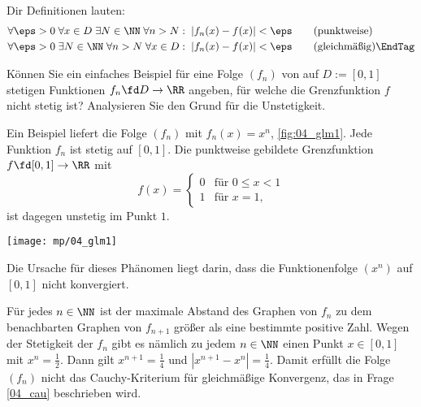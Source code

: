 \begin{antwort}
 Dir Definitionen lauten:
\begin{align}
\forall \eps > 0\; \forall x\in D\;  
\exists N\in\NN\; \forall n > N:\;| f_n(x)-f(x) | < \eps &\qquad 
\text{(punktweise)} \notag \\
\forall \eps > 0\;  \exists N\in\NN\;
\forall n > N\; \forall x\in D:\; | f_n(x)-f(x) | < \eps &\qquad 
\text{(gleichmäßig)} \EndTag 
\end{align}
\end{antwort} 

\begin{frage}\label{04_gbsp}
Können Sie ein einfaches Beispiel für eine Folge $(f_n)$ von 
auf $D:= [0,1]$ stetigen Funktionen $f_n\fd D \to \RR$ angeben, für welche 
die Grenzfunktion $f$ nicht stetig ist? Analysieren Sie den Grund für die 
Unstetigkeit.
\end{frage}
 

\begin{antwort}
Ein Beispiel liefert die Folge $(f_n)$ mit 
$f_n(x) =x^n$, \sieheAbbildung\ref{fig:04_glm1}. 
Jede Funktion $f_n$ ist stetig auf $[0,1]$. 
Die punktweise gebildete Grenzfunktion $f\fd [0,1]\to\RR$ 
mit 
\[
f(x)= \left\{ \begin{array}{ll}
0 & \text{für $0\le x < 1$} \\
1 & \text{für $x=1$,} 
\end{array}\right.
\]
ist dagegen unstetig im Punkt $1$. 

\begin{center}
  \texttt{[image: mp/04\_glm1]}
  \label{fig:04_glm1}
\end{center}

Die Ursache für dieses Phänomen liegt darin, 
dass die Funktionenfolge $(x^n)$ auf $[0,1]$ 
nicht  konvergiert. 

Für jedes $n\in\NN$ ist der maximale Abstand des Graphen von 
$f_n$ zu dem benachbarten Graphen von $f_{n+1}$ größer als 
eine bestimmte positive Zahl. Wegen der 
Stetigkeit der $f_n$ gibt es nämlich zu jedem $n\in\NN$ 
einen Punkt $x\in[0,1]$ mit $x^n=\frac{1}{2}$. 
Dann gilt $x^{n+1}=\frac{1}{4}$ und 
$|x^{n+1}-x^n|=\frac{1}{4}$. Damit erfüllt die Folge $(f_n)$ 
nicht das Cauchy-Kriterium für gleichmäßige Konvergenz, das in Frage 
\ref{04_cau} beschrieben wird. 
\AntEnd
\end{antwort}

